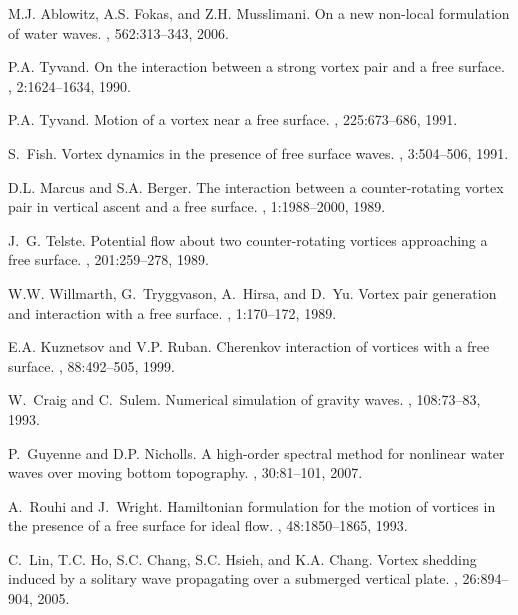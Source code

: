 \documentclass[a4paper,11pt]{article}
\begin{document}
\begin{thebibliography}{20}
\setlength{\itemsep}{-0.7mm}
\small

M.J. Ablowitz, A.S. Fokas, and Z.H. Musslimani.
\newblock On a new non-local formulation of water waves.
, 562:313--343, 2006.

P.A. Tyvand.
\newblock On the interaction between a strong vortex pair and a free surface.
, 2:1624--1634, 1990.

P.A. Tyvand.
\newblock Motion of a vortex near a free surface.
, 225:673--686, 1991.

S.~Fish.
\newblock Vortex dynamics in the presence of free surface waves.
, 3:504--506, 1991.

D.L. Marcus and S.A. Berger.
\newblock The interaction between a counter-rotating vortex pair in vertical
  ascent and a free surface.
, 1:1988--2000, 1989.

J.~G. Telste.
\newblock Potential flow about two counter-rotating vortices approaching a free
  surface.
, 201:259--278, 1989.

W.W. Willmarth, G.~Tryggvason, A.~Hirsa, and D.~Yu.
\newblock Vortex pair generation and interaction with a free surface.
, 1:170--172, 1989.

E.A. Kuznetsov and V.P. Ruban.
\newblock Cherenkov interaction of vortices with a free surface.
, 88:492--505, 1999.

W.~Craig and C.~Sulem.
\newblock Numerical simulation of gravity waves.
, 108:73--83, 1993.

P.~Guyenne and D.P. Nicholls.
\newblock A high-order spectral method for nonlinear water waves over moving
  bottom topography.
, 30:81--101, 2007.

A.~Rouhi and J.~Wright.
\newblock Hamiltonian formulation for the motion of vortices in the presence of
  a free surface for ideal flow.
, 48:1850--1865, 1993.

C.~Lin, T.C. Ho, S.C. Chang, S.C. Hsieh, and K.A. Chang.
\newblock Vortex shedding induced by a solitary wave propagating over a
  submerged vertical plate.
, 26:894--904, 2005.


\end{thebibliography}
\end{document}
